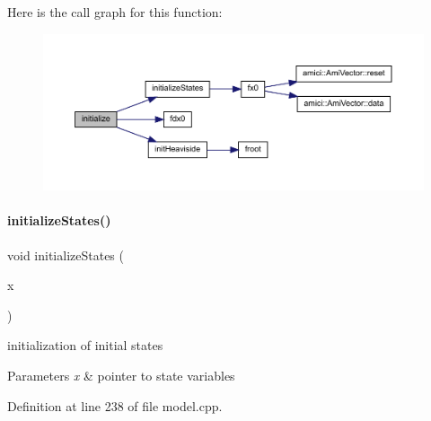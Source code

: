 Here is the call graph for this function\+:
\nopagebreak
\begin{figure}[H]
\begin{center}
\leavevmode
\includegraphics[width=350pt]{classamici_1_1_model_a4d8f308f15a126dde571f2e26787d3e8_cgraph}
\end{center}
\end{figure}
\mbox{\label{classamici_1_1_model_a73d147a7108479e20833ba816cac0f6b}} 
\paragraph{\texorpdfstring{initialize\+States()}{initializeStates()}}
{\footnotesize\ttfamily void initialize\+States (\begin{DoxyParamCaption}\item[{\mbox{\hyperlink{classamici_1_1_ami_vector}{Ami\+Vector}} $\ast$}]{x }\end{DoxyParamCaption})}

initialization of initial states 
\begin{DoxyParams}{Parameters}
{\em x} & pointer to state variables \\
\hline
\end{DoxyParams}


Definition at line 238 of file model.\+cpp.


